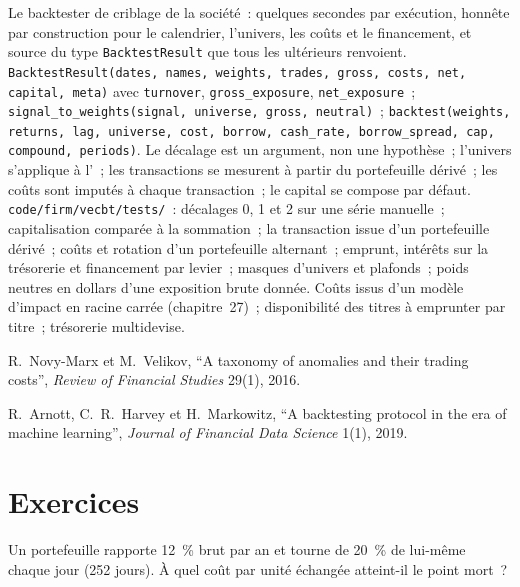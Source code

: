 \begin{build}
 Le backtester de criblage de la société~: quelques secondes par exécution, honnête par construction pour le calendrier, l'univers, les coûts et le financement, et source
du type \texttt{BacktestResult} que tous les  ultérieurs renvoient.
 \texttt{BacktestResult(dates, names, weights, trades, gross, costs, net, capital, meta)} avec \texttt{turnover},
\texttt{gross\_exposure}, \texttt{net\_exposure}~; \texttt{signal\_to\_weights(signal, universe, gross, neutral)}~; \texttt{backtest(weights, returns, lag,
universe, cost, borrow, cash\_rate, borrow\_spread, cap, compound, periods)}.
 Le décalage est un argument, non une hypothèse~; l'univers s'applique à l'~; les transactions se mesurent à partir du portefeuille dérivé~; les coûts
sont imputés à chaque transaction~; le capital se compose par défaut.
 \texttt{code/firm/vecbt/tests/}~: décalages 0, 1 et 2 sur une série manuelle~; capitalisation comparée à la sommation~; la transaction issue d'un portefeuille dérivé~;
coûts et rotation d'un portefeuille alternant~; emprunt, intérêts sur la trésorerie et financement par levier~; masques d'univers et plafonds~; poids neutres en dollars d'une exposition brute donnée.
 Coûts issus d'un modèle d'impact en racine carrée (chapitre~27)~; disponibilité des titres à emprunter par titre~; trésorerie multidevise.
\end{build}

\begin{omsources}
\item R.~Novy-Marx et M.~Velikov, ``A taxonomy of anomalies and their trading costs'', \emph{Review of Financial Studies} 29(1), 2016.
\item R.~Arnott, C.~R.~Harvey et H.~Markowitz, ``A backtesting protocol in the era of machine learning'', \emph{Journal of Financial Data Science} 1(1), 2019.
\end{omsources}

\section{Exercices}

\begin{exercise}[$\star$]\label{exo:rs:vectorised-backtests:1}
Un portefeuille rapporte 12~\% brut par an et tourne de 20~\% de lui-même chaque jour (252 jours). À quel coût par unité échangée atteint-il le point mort~?
\end{exercise}

